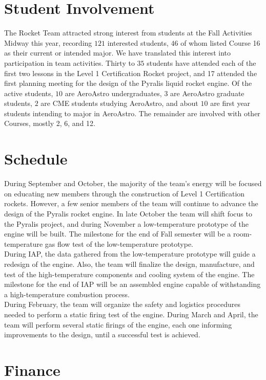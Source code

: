 \documentclass{article}
\begin{document}
\section*{Student Involvement}
The Rocket Team attracted strong interest from students at the Fall Activities Midway this year, recording $121$ interested students, $46$ of whom listed Course 16 as their current or intended major. We have translated this interest into participation in team activities. Thirty to $35$ students have attended each of the first two lessons in the Level 1 Certification Rocket project, and 17 attended the first planning meeting for the design of the Pyralis liquid rocket engine. Of the active students, $10$ are AeroAstro undergraduates, $3$ are AeroAstro graduate students, $2$ are CME students studying AeroAstro, and about $10$ are first year students intending to major in AeroAstro. The remainder are involved with other Courses, mostly 2, 6, and 12.
\section*{Schedule}
During September and October, the majority of the team's energy will be focused on educating new members through the construction of Level 1 Certification rockets. However, a few senior members of the team will continue to advance the design of the Pyralis rocket engine. In late October the team will shift focus to the Pyralis project, and during November a low-temperature prototype of the engine will be built. The milestone for the end of Fall semester will be a room-temperature gas flow test of the low-temperature prototype.\\

During IAP, the data gathered from the low-temperature prototype will guide a redesign of the engine. Also, the team will finalize the design, manufacture, and test of the high-temperature components and cooling system of the engine. The milestone for the end of IAP will be an assembled engine capable of withstanding a high-temperature combustion process. \\

During February, the team will organize the safety and logistics procedures needed to perform a static firing test of the engine. During March and April, the team will perform several static firings of the engine, each one informing improvements to the design, until a successful test is achieved.

\section*{Finance}
\end{document}
